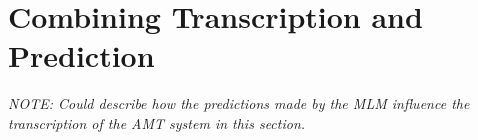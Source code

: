 \section{Combining Transcription and Prediction}
\label{sec:combination}

\textit{NOTE: Could describe how the predictions made by the MLM influence the transcription of the  AMT system in this section.}